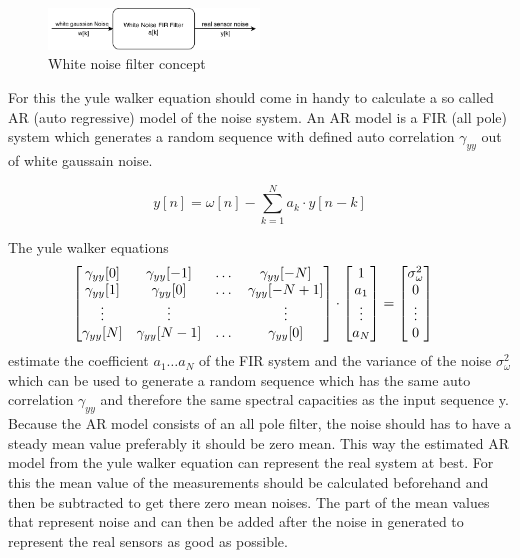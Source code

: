  \begin{figure}[h!]
 \centering
 \includegraphics[width=0.5\textwidth]{./Pictures/WhiteNoiseFilter.pdf}
 \caption{White noise filter concept}
 \label{fig:WhiteNoiseFilter}
\end{figure}
  
  
  For this the yule walker equation should come in handy to calculate a so called AR (auto regressive) model of the noise system.
  An AR model is a FIR (all pole) system which generates a random sequence with defined auto correlation $\gamma_{yy}$ out of white gaussain noise.
  
  $$ y[n] = \omega[n] - \sum_{k=1}^{N} a_k \cdot y[n-k]  $$
  
  The yule walker equations
  \begin{align*}
    \begin{bmatrix}
     \gamma_{yy}[0] & \gamma_{yy}[-1] & \dots & \gamma_{yy}[-N] \\
     \gamma_{yy}[1] & \gamma_{yy}[0] & \dots & \gamma_{yy}[-N+1] \\
     \vdots 		& \vdots 	& 	& \vdots	\\
     \gamma_{yy}[N] & \gamma_{yy}[N-1] & \dots & \gamma_{yy}[0]
    \end{bmatrix}
    & \cdot
    \begin{bmatrix}
     1 \\
     a_1 \\
     \vdots \\
     a_N   
    \end{bmatrix}
    = 
    \begin{bmatrix}
     \sigma^2_\omega \\
     0 \\
     \vdots \\
     0
    \end{bmatrix}
    \hfill
  \end{align*}
  \hfill
  estimate the coefficient $a_1 \dots a_N $ of the FIR system and the variance of the noise $\sigma^2_\omega $ which can be used to generate a random sequence which has the same auto correlation $\gamma_{yy}$ and therefore the same spectral capacities as the input sequence y.
  Because the AR model consists of an all pole filter, the noise should has to have a steady mean value preferably it should be zero mean.
  This way the estimated AR model from the yule walker equation can represent the real system at best.
  For this the mean value of the measurements should be calculated beforehand and then be subtracted to get there zero mean noises.
  The part of the mean values that represent noise and can then be added after the noise in generated to represent the real sensors as good as possible.
  
